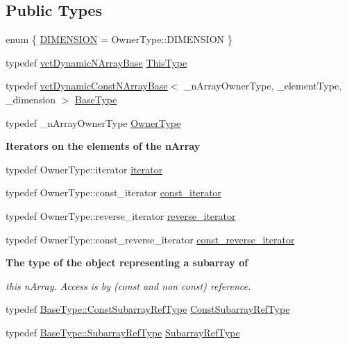 \subsection*{Public Types}
\begin{DoxyCompactItemize}
\item 
enum \{ \hyperlink{classvct_dynamic_n_array_base_aa66532d28588bdf26d08fb593db815d6abfcde386ec801b212d7c42d63a4f3837}{D\+I\+M\+E\+N\+S\+I\+O\+N} = Owner\+Type\+:\+:D\+I\+M\+E\+N\+S\+I\+O\+N
 \}
\item 
typedef \hyperlink{classvct_dynamic_n_array_base}{vct\+Dynamic\+N\+Array\+Base} \hyperlink{classvct_dynamic_n_array_base_a22ffd87e54134c364487952ce7d84dd5}{This\+Type}
\item 
typedef \hyperlink{classvct_dynamic_const_n_array_base}{vct\+Dynamic\+Const\+N\+Array\+Base}$<$ \+\_\+n\+Array\+Owner\+Type, \+\_\+element\+Type, \+\_\+dimension $>$ \hyperlink{classvct_dynamic_n_array_base_ac2c95af53fa85b36f67bdc9ffe0d1737}{Base\+Type}
\item 
typedef \+\_\+n\+Array\+Owner\+Type \hyperlink{classvct_dynamic_n_array_base_a856048c87677204bd0338cce0e14abf6}{Owner\+Type}
\end{DoxyCompactItemize}
\begin{Indent}{\bf Iterators on the elements of the n\+Array}\par
\begin{DoxyCompactItemize}
\item 
typedef Owner\+Type\+::iterator \hyperlink{classvct_dynamic_n_array_base_afe6d2a8cd86a6b3a0828249b976389ba}{iterator}
\item 
typedef Owner\+Type\+::const\+\_\+iterator \hyperlink{classvct_dynamic_n_array_base_a77193963c2949409a70d820f87ba9ddb}{const\+\_\+iterator}
\item 
typedef Owner\+Type\+::reverse\+\_\+iterator \hyperlink{classvct_dynamic_n_array_base_a4a0adcb47fb464b8dd1a1e2495a52468}{reverse\+\_\+iterator}
\item 
typedef Owner\+Type\+::const\+\_\+reverse\+\_\+iterator \hyperlink{classvct_dynamic_n_array_base_a63dd44f3924be6ea9240772286f7bfd2}{const\+\_\+reverse\+\_\+iterator}
\end{DoxyCompactItemize}
\end{Indent}
\begin{Indent}{\bf The type of the object representing a subarray of}\par
{\em this n\+Array. Access is by (const and non const) reference. }\begin{DoxyCompactItemize}
\item 
typedef \hyperlink{classvct_dynamic_const_n_array_base_a4b3508630e409eda4f0d2f55d17d89a4}{Base\+Type\+::\+Const\+Subarray\+Ref\+Type} \hyperlink{classvct_dynamic_n_array_base_a022316a8c3f976026301c5da668d1fb4}{Const\+Subarray\+Ref\+Type}
\item 
typedef \hyperlink{classvct_dynamic_const_n_array_base_a4db8630795191b1854a5af85b9327ee3}{Base\+Type\+::\+Subarray\+Ref\+Type} \hyperlink{classvct_dynamic_n_array_base_a473d1fefa0debae5d9f6b0cd3a05f269}{Subarray\+Ref\+Type}
\end{DoxyCompactItemize}
\end{Indent}
